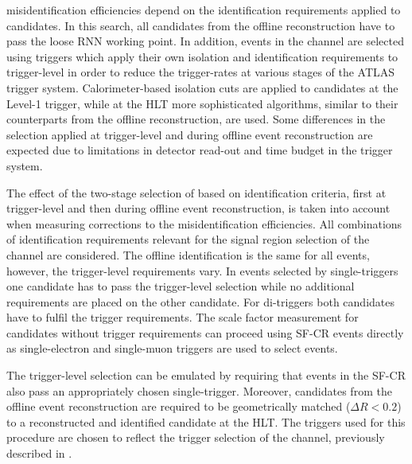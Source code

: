 \Jettotauhadvis misidentification efficiencies depend on the
identification requirements applied to \tauhadvis candidates. In this
search, all \tauhadvis candidates from the offline reconstruction have
to pass the loose RNN \tauid working point. In addition, events in the
\hadhad channel are selected using \tauhadvis triggers which apply
their own isolation and identification requirements to trigger-level
\tauhadvis in order to reduce the trigger-rates at various stages of
the ATLAS trigger system. Calorimeter-based isolation cuts are applied
to \tauhadvis candidates at the Level-1 trigger, while at the HLT more
sophisticated \tauid algorithms, similar to their counterparts from
the offline reconstruction, are used. Some differences in the
selection applied at trigger-level and during offline event
reconstruction are expected due to limitations in detector read-out
and time budget in the trigger
system. %

The effect of the two-stage selection of \tauhadvis based on
identification criteria, first at trigger-level and then during
offline event reconstruction, is taken into account when measuring
corrections to the \jettotauhadvis misidentification efficiencies. All
combinations of \tauhadvis identification requirements relevant for
the signal region selection of the \hadhad channel are considered. The
offline \tauhadvis identification is the same for all events, however,
the trigger-level requirements vary. In events selected by
single-\tauhadvis triggers one \tauhadvis candidate has to pass the
trigger-level selection while no additional requirements are placed on
the other \tauhadvis candidate. For di-\tauhadvis triggers both
candidates have to fulfil the trigger requirements. The scale factor
measurement for \tauhadvis candidates without trigger requirements can
proceed using SF-CR events directly as single-electron and single-muon
triggers are used to select events.

The trigger-level \tauhadvis selection can be emulated by requiring
that events in the SF-CR also pass an appropriately chosen
single-\tauhadvis trigger. Moreover, \tauhadvis candidates from the
offline event reconstruction are required to be geometrically matched
($\Delta R < 0.2$) to a reconstructed and identified \tauhadvis
candidate at the HLT. The \tauhadvis triggers used for this procedure
are chosen to reflect the trigger selection of the \hadhad channel,
previously described in .

